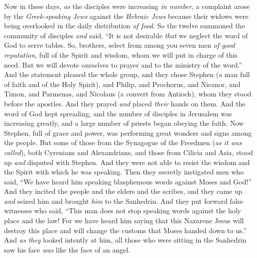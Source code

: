 \begin{biblechapter} %
 Now in these days, \textit{as} the disciples were increasing \textit{in number}, a complaint arose by the \textit{Greek-speaking Jews} against the \textit{Hebraic Jews} because their widows were being overlooked in the daily distribution \textit{of food}.
\verse So the twelve summoned the community of disciples \textit{and} said, “It is not desirable \textit{that} we neglect the word of God to serve tables.
\verse So, brothers, select from among you seven men \textit{of good reputation}, full of the Spirit and wisdom, whom we will put in charge of this need.
\verse But we will devote ourselves to prayer and to the ministry of the word.”
\verse And the statement pleased the whole group, and they chose Stephen (a man full of faith and of the Holy Spirit), and Philip, and Prochorus, and Nicanor, and Timon, and Parmenas, and Nicolaus (a convert from Antioch),
\verse whom they stood before the apostles. And they prayed \textit{and} placed \textit{their} hands on them.
\verse And the word of God kept spreading, and the number of disciples in Jerusalem was increasing greatly, and a large number of priests began obeying the faith.
 Now Stephen, full of grace and power, was performing great wonders and signs among the people.
\verse But some of those from the Synagogue of the Freedmen (\textit{as it was called}), both Cyrenians and Alexandrians, and those from Cilicia and Asia, stood up \textit{and} disputed with Stephen.
\verse And they were not able to resist the wisdom and the Spirit with which he was speaking.
\verse Then they secretly instigated men who said, “We have heard him speaking blasphemous words against Moses and God!”
\verse And they incited the people and the elders and the scribes, and they came up \textit{and} seized him and brought \textit{him} to the Sanhedrin.
\verse And they put forward false witnesses who said, “This man does not stop speaking words against the holy place and the law!
\verse For we have heard him saying that this Nazarene Jesus will destroy this place and will change the customs that Moses handed down to us.”
\verse And \textit{as they} looked intently at him, all those who were sitting in the Sanhedrin saw his face \textit{was} like the face of an angel.
\end{biblechapter}


